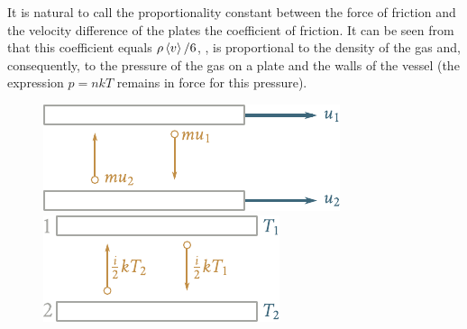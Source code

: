 It is natural to call the proportionality constant between the force of friction and the velocity difference of the plates the coefficient of friction. It can be seen from  that this coefficient equals $\rho\left\langle v \right\rangle/6$, \ie, is proportional to the density of the gas and, consequently, to the pressure of the gas on a plate and the walls of the vessel (the expression $p=nkT$ remains in force for this pressure).

\begin{figure}[t]
	\begin{minipage}[t]{0.5\linewidth}
		\begin{center}
			\includegraphics[scale=1]{figures/ch_16/fig_16_10.pdf}
			\caption[]{}
			\label{fig:16_10}
		\end{center}
	\end{minipage}
	\hspace{-0.05cm}
	\begin{minipage}[t]{0.5\linewidth}
		\begin{center}
			\includegraphics[scale=1]{figures/ch_16/fig_16_11.pdf}
			\caption[]{}
			\label{fig:16_11}
		\end{center}
	\end{minipage}
	\vspace{-0.4cm}
\end{figure}

